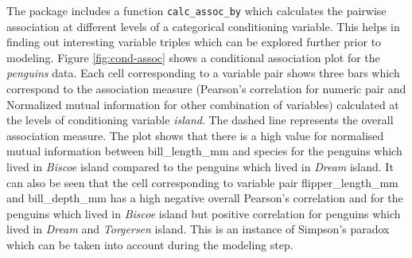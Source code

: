 The package includes a function \texttt{calc\_assoc\_by} which
calculates the pairwise association at different levels of a categorical
conditioning variable. This helps in finding out interesting variable
triples which can be explored further prior to modeling. Figure
\ref{fig:cond-assoc} shows a conditional association plot for the
\emph{penguins} data. Each cell corresponding to a variable pair shows
three bars which correspond to the association measure (Pearson's
correlation for numeric pair and Normalized mutual information for other
combination of variables) calculated at the levels of conditioning
variable \emph{island}. The dashed line represents the overall
association measure. The plot shows that there is a high value for
normalised mutual information between bill\_length\_mm and species for
the penguins which lived in \emph{Biscoe} island compared to the
penguins which lived in \emph{Dream} island. It can also be seen that
the cell corresponding to variable pair flipper\_length\_mm and
bill\_depth\_mm has a high negative overall Pearson's correlation and
for the penguins which lived in \emph{Biscoe} island but positive
correlation for penguins which lived in \emph{Dream} and
\emph{Torgersen} island. This is an instance of Simpson's paradox which
can be taken into account during the modeling step.

